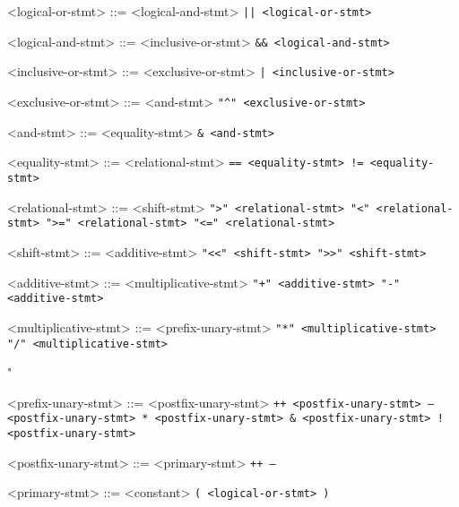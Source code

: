 \documentclass[leqno, 12pt]{article}
\begin{document}
\begin{grammar}
            <logical-or-stmt> ::= <logical-and-stmt>
             \tt{||} <logical-or-stmt>

            <logical-and-stmt> ::= <inclusive-or-stmt>
             \tt{\&\&} <logical-and-stmt>

            <inclusive-or-stmt> ::= <exclusive-or-stmt>
             \tt{|} <inclusive-or-stmt>

            <exclusive-or-stmt> ::= <and-stmt>
             \tt{"^"} <exclusive-or-stmt>

            <and-stmt> ::= <equality-stmt>
             \tt{\&} <and-stmt>

            <equality-stmt> ::= <relational-stmt>
             \tt{==} <equality-stmt>
             \tt{!=} <equality-stmt>

            <relational-stmt> ::= <shift-stmt>
             \tt{">"} <relational-stmt>
             \tt{"<"} <relational-stmt>
             \tt{">="} <relational-stmt>
             \tt{"<="} <relational-stmt>

            <shift-stmt> ::= <additive-stmt>
             \tt{"<<"} <shift-stmt>
             \tt{">>"} <shift-stmt>

            <additive-stmt> ::= <multiplicative-stmt>
             \tt{"+"} <additive-stmt>
             \tt{"-"} <additive-stmt>

            <multiplicative-stmt> ::= <prefix-unary-stmt>
             \tt{"*"} <multiplicative-stmt>
             \tt{"/"} <multiplicative-stmt>
             \tt{"%

            <prefix-unary-stmt> ::= <postfix-unary-stmt>
            \alt \tt{++} <postfix-unary-stmt>
            \alt \tt{--} <postfix-unary-stmt>
            \alt \tt{*} <postfix-unary-stmt>
            \alt \tt{\&} <postfix-unary-stmt>
            \alt \tt{!} <postfix-unary-stmt>

            <postfix-unary-stmt> ::= <primary-stmt>
             \tt{++}
             \tt{--}

            <primary-stmt> ::= <constant>
            \alt \tt{(} <logical-or-stmt> \tt{)}
            
}
\end{grammar}
\end{document}
